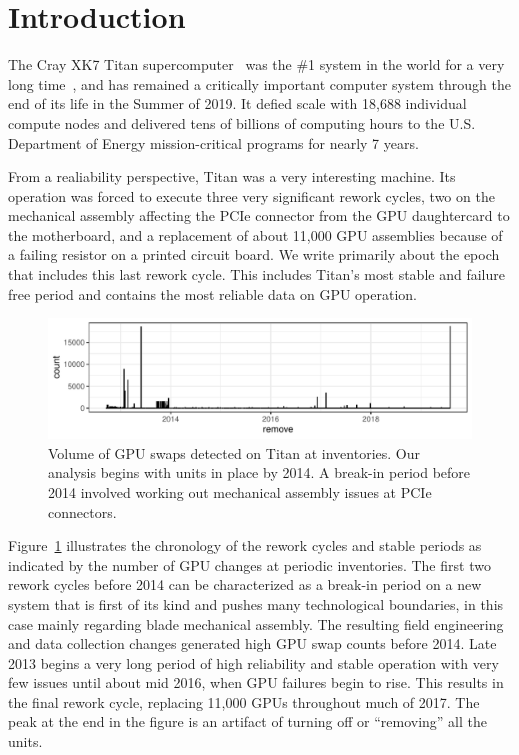 \section{Introduction}
\label{section:introduction}
The Cray XK7 Titan supercomputer~\cite{olcf:titan} was the \#1 system
in the world for a very long time~\cite{top500list}, and has remained
a critically important computer system through the end of its life in
the Summer of 2019. It defied scale with 18,688 individual compute
nodes and delivered tens of billions of computing hours to the
U.S. Department of Energy mission-critical programs for nearly 7
years.
 
From a realiability perspective, Titan was a very interesting
machine. Its operation was forced to execute three very significant
rework cycles, two on the mechanical assembly affecting the PCIe
connector from the GPU daughtercard to the motherboard, and a
replacement of about 11,000 GPU assemblies because of a failing
resistor on a printed circuit board. We write primarily about the epoch
that includes this last rework cycle. This includes Titan's most
stable and failure free period and contains the most reliable data on
GPU operation.

\begin{figure}[tb]
  \centering
  \includegraphics[width=\textwidth]{figs/chronology001.pdf}
  \caption{Volume of GPU swaps detected on Titan at inventories. Our
    analysis begins with units in place by 2014. A break-in period
    before 2014 involved working out mechanical assembly issues at
    PCIe connectors.}
  \label{fig:chronology}
\end{figure}
Figure~\ref{fig:chronology} illustrates the chronology of the rework
cycles and stable periods as indicated by the number of GPU changes at
periodic inventories.  The first two rework cycles before 2014 can be
characterized as a break-in period on a new system that is first of
its kind and pushes many technological boundaries, in this case mainly
regarding blade mechanical assembly. The resulting field engineering
and data collection changes generated high GPU swap counts before
2014. Late 2013 begins a very long period of high reliability and
stable operation with very few issues until about mid 2016, when GPU
failures begin to rise. This results in the final rework cycle,
replacing 11,000 GPUs throughout much of 2017. The peak at the end in
the figure is an artifact of turning off or ``removing'' all the
units. 

